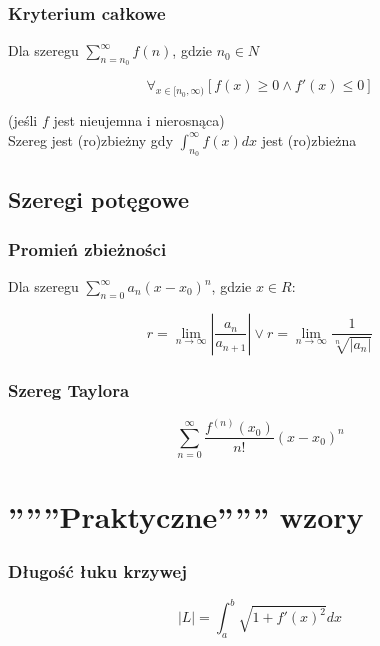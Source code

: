 \documentclass[11pt]{article}
\begin{document}
\subsubsection{Kryterium całkowe}
\noindent Dla szeregu $\sum_{n=n_0}^{\infty} f(n)$, gdzie $n_0 \in N$

\begin{equation}
	\forall_{x \in [n_0, \infty)}\left[f(x) \geq 0 \land f'(x) \leq 0\right]
\end{equation}

\noindent (jeśli $f$ jest nieujemna i nierosnąca)\\
\noindent Szereg jest (ro)zbieżny gdy $\int_{n_0}^{\infty} f(x) dx$ jest (ro)zbieżna


\subsection{Szeregi potęgowe}

\subsubsection{Promień zbieżności}

Dla szeregu $\sum_{n=0}^{\infty} a_n(x-x_0)^n$, gdzie $x \in R$:

\begin{equation}
	r = \lim_{n \to \infty} \left|\frac{a_n}{a_{n+1}}\right| \lor r = \lim_{n \to \infty} \frac{1}{\sqrt[n]{|a_n|}}
\end{equation}


\subsubsection{Szereg Taylora}
\begin{equation}
	\sum_{n=0}^{\infty} \frac{f^{(n)}(x_0)}{n!} (x - x_0)^n
\end{equation}

\pagebreak

\section{''''''Praktyczne'''''' wzory}

\subsubsection{Długość łuku krzywej}
\begin{equation}
	|L| = \int_a^b \sqrt{1 + f'(x)^2}dx
\end{equation}
\end{document}
